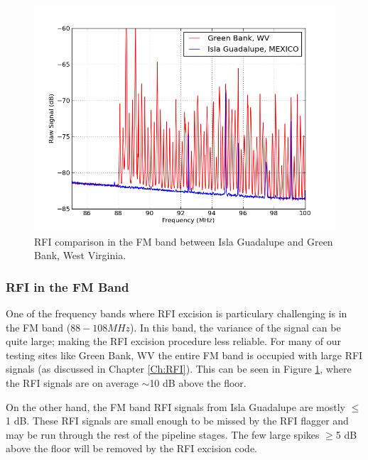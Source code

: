 \begin{figure}[htb]
\begin{center}
\includegraphics[width=0.9\linewidth]{Data_analysis/figures/FM_band_comp.png}
\caption{RFI comparison in the FM band between Isla Guadalupe and Green Bank, West Virginia. }
\label{Fig:FM_band}
\end{center}
\end{figure}

\subsubsection{RFI in the FM Band}

One of the frequency bands where RFI excision is particulary challenging is in the FM band ($88-108 MHz$). In this band, the variance of the signal can be quite large; making the RFI excision procedure less reliable. For many of our testing sites like Green Bank, WV the entire FM band is occupied with large RFI signals (as discussed in Chapter \ref{Ch:RFI}). This can be seen in Figure \ref{Fig:FM_band}, where the RFI signals are on average $\sim$10 dB above the floor. 

On the other hand, the FM band RFI signals from Isla Guadalupe are mostly $\leq$1 dB. These RFI signals are small enough to be missed by the RFI flagger and may be run through the rest of the pipeline stages. The few large spikes $\geq$5 dB above the floor will be removed by the RFI excision code. 

